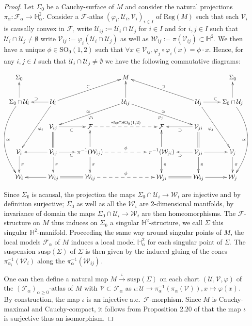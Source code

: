 \documentclass[a4paper,12pt]{article}
\def\H{\mathbb{H}}
\def\U{\mathcal U}
\def\GGL{\SO_0(1,2)}
\def\V{\mathcal V}
\def\SO{\mathrm{SO}}
\def\Reg{\mathrm{Reg}}
\def\susp{\mathrm{susp}}
\def\reg{\Reg}
\def\V{\mathcal V}
\def\W{\mathcal W}
\def\SO{\mathrm{SO}}
\def\Future{\mathcal F}
\def\reg{\mathrm{Reg}}
\def\U{\mathcal{U}}
\def\Reg{\mathrm{Reg}}
\def\susp{\mathrm{susp}}
\theoremstyle{definition}
\begin{document}
		\begin{proof}
		 Let $\Sigma_0$ be a Cauchy-surface of $M$ and consider the natural projections $\pi_\alpha: \Future_\alpha\rightarrow \H^2_\alpha$.		 
		 Consider a $\Future$-atlas $(\varphi_i,\U_i,\V_i)_{i\in I}$ of $\reg(M)$ such that each $\V_i$ is causally convex in $\Future$, write $\U_{ij}:=\U_i\cap \U_j$ for $i\in I$ and for $i,j\in I$ such that $\U_i\cap \U_j\neq \emptyset$ write $\V_{ij}:= \varphi_i(\U_i\cap \U_j)$ as well as $\W_{ij}:=\pi(\V_{ij})\subset \H^2$. We then have a unique $\phi\in \GGL$ such that $\forall x\in \V_{ij},\varphi_j\circ \varphi_{i}(x)=\phi\cdot x$. 
		 Hence, for any $i,j\in I$ such that $\U_i\cap \U_j\neq \emptyset$ we have the following commutative diagrams:
		 
		 $$
		 \xymatrix{\Sigma_0&&&M&&&\Sigma_0\\
		 \Sigma_0\cap \U_i\ar[u]\ar@/_2pc/[ddd]^\simeq&\ar[l]_ {\supset}\U_i\ar[ddl]^{\varphi_i}\ar[urr]^{\subset}&&\U_{ij}\ar[u]\ar[drr]^{\simeq}_{\varphi_j}\ar[dll]^{\varphi_i}_{\simeq}&&\U_j\ar[r]^{\subset}\ar[ull]_{\supset}\ar[ddr]_ {\varphi_j}& \Sigma_0\cap \U_j\ar[u]\ar@/^2pc/[ddd]_\simeq\\
		 &\V_{ij}\ar[r]_{\subset}\ar@{=}[d]&\Future\ar@{-->}[rr]^{\exists! \phi\in \GGL}&&\Future&\V_{ji}\ar[l]^{\supset}\ar@{=}[d]&
		 \\ \V_i\ar[d]^\pi&\ar[l]\V_{ij}\ar[d]^{\pi}\ar[r]_{\subset}&\pi^{-1}(\W_{ij})\ar[u]\ar@{-->}[rr]^\phi\ar[d]^\pi&&\pi^{-1}(\W_{ji})\ar[u]\ar[d]^{\pi}&\ar[l]^{\supset}\V_{ji}\ar[r]\ar[d]^{\pi}&\V_j \ar[d]^\pi 
		 \\ \W_i &\ar[l]\W_{ij}\ar@{=}[r]&\W_{ij}\ar@{-->}[rr]^\phi&&\W_{ji}\ar@{=}[r]&\W_{ij}\ar[r]& \W_j
		 } $$
		
		Since $\Sigma_0$ is acausal, the projection the maps $\Sigma_0\cap \U_i\rightarrow \W_i$ are injective and by definition surjective; $\Sigma_0$ as well as all the $\W_i$ are 2-dimensional manifolds, by invariance of domain the maps $\Sigma_0\cap \U_i\rightarrow \W_i$ are then homeomorphisms.
		The $\Future$-structure on $M$ thus induces on $\Sigma_0$ a singular $\H^2$-structure, we call $\Sigma$ this singular $\H^2$-manifold. Proceeding the same way around singular points of $M$, the local models $\Future_\alpha$ of $M$ induces a local model $\H^2_ \alpha$ for each singular point of $\Sigma$. The suspension $\susp(\Sigma)$ of $\Sigma$ is then given by the induced gluing of the cones $\pi^{-1}_{\alpha_i}(\W_i)$ along the $\pi^{-1}_{\alpha}(\W_{ij})$.
		
		One can then define a natural map $M\xrightarrow{\iota} \susp(\Sigma)$ on each chart $(\U,\V,\varphi)$ of the $(\Future_\alpha)_{\alpha\geq0}$-atlas of $M$ with $\V\subset \Future_\alpha$ as 
		$\iota: \U \rightarrow \pi_\alpha^{-1}(\pi_\alpha(\V)), x\mapsto \varphi(x)$. By construction, the map $\iota$ is an injective a.e.\ $\Future$-morphism. Since $M$ is Cauchy-maximal and Cauchy-compact, it follows from Proposition 2.20 of \cite{brunswic2021Cauchy} that the map $\iota$ is surjective thus an isomorphism.\end{proof}
\end{document}
